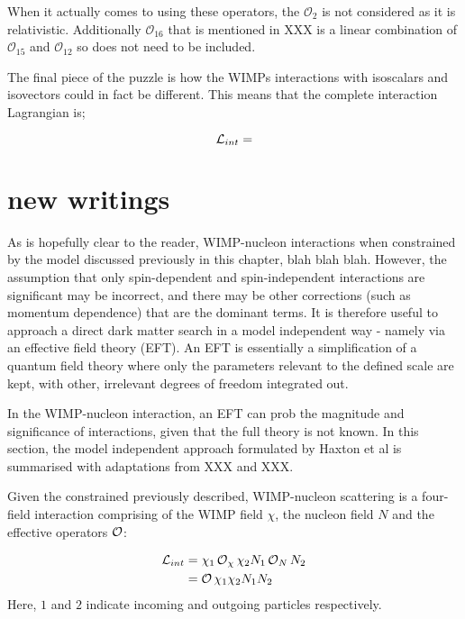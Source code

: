 \par
When it actually comes to using these operators, the $\mathcal{O}_{2}$ is not considered as it is relativistic. 
Additionally $\mathcal{O}_{16}$ that is mentioned in XXX is a linear combination of $\mathcal{O}_{15}$ and $\mathcal{O}_{12}$ so does not need to be included.

\par
The final piece of the puzzle is how the WIMPs interactions with isoscalars and isovectors could in fact be different.
This means that the complete interaction Lagrangian is;

\begin{equation}
    \operatorname{\mathcal{L}}_{int} = 
    \label{eq:HENR_Interaction_Lagrangian}
\end{equation}

\section{new writings}
\par
As is hopefully clear to the reader, WIMP-nucleon interactions when constrained by the model discussed previously in this chapter, blah blah blah.
However, the assumption that only spin-dependent and spin-independent interactions are significant may be incorrect, and there may be other corrections (such as momentum dependence) that are the dominant terms.
It is therefore useful to approach a direct dark matter search in a model independent way - namely via an effective field theory (EFT).
An EFT is essentially a simplification of a quantum field theory where only the parameters relevant to the defined scale are kept, with other, irrelevant degrees of freedom integrated out.

\par
In the WIMP-nucleon interaction, an EFT can prob the magnitude and significance of interactions, given that the full theory is not known.
In this section, the model independent approach formulated by Haxton et al is summarised with adaptations from XXX and XXX.

\par
Given the constrained previously described, WIMP-nucleon scattering is a four-field interaction comprising of the WIMP field $\chi$, the nucleon field $N$ and the effective operators $\operatorname{\mathcal{O}}$:

\begin{align*}
    \operatorname{\mathcal{L}}_{int} &= \chi_{1} \operatorname{\mathcal{O}}_{\chi} \chi_{2} N_{1} \operatorname{\mathcal{O}}_{N} N_{2} \\
                      &= \operatorname{\mathcal{O}} \chi_{1}\chi_{2} N_{1}N_{2}
\end{align*}
Here, $1$ and $2$ indicate incoming and outgoing particles respectively.

